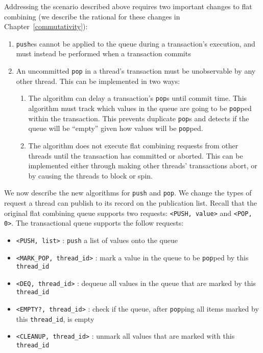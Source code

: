 Addressing the scenario described above requires two important changes to flat combining (we describe the rational for these changes in Chapter~\ref{commutativity}): 
\begin{enumerate}
\item \texttt{push}es cannot be applied to the queue during a transaction's execution, and must instead be performed when a transaction commits
\item An uncommitted \texttt{pop} in a thread's transaction must be unobservable by any other thread. This can be implemented in two ways:  
    \begin{enumerate}
        \item The algorithm can delay a transaction's \texttt{pop}s until commit time. This algorithm must track which values in the queue are going to be \texttt{pop}ped within the transaction. This prevents duplicate \texttt{pop}s and detects if the queue will be ``empty'' given how values will be \texttt{pop}ped.
        \item The algorithm does not execute flat combining requests from other threads until the transaction has committed or aborted. This can be implemented either through making other threads' transactions abort, or by causing the threads to block or spin.
    \end{enumerate}
\end{enumerate}

We now describe the new algorithms for \texttt{push} and \texttt{pop}.  We change the types of request a thread can publish to its record on the publication list. Recall that the original flat combining queue supports two requests: \texttt{<PUSH, value>} and \texttt{<POP, 0>}. The transactional queue supports the follow requests:
\begin{itemize}
    \item \texttt{<PUSH, list>} : \texttt{push} a list of values onto the queue
    \item \texttt{<MARK\_POP, thread\_id>} : mark a value in the queue to be \texttt{pop}ped by this \texttt{thread\_id}
    \item \texttt{<DEQ, thread\_id>} : dequeue all values in the queue that are marked by this \texttt{thread\_id}
    \item \texttt{<EMPTY?, thread\_id>} : check if the queue, after \texttt{pop}ping all items marked by this \texttt{thread\_id}, is empty
    \item \texttt{<CLEANUP, thread\_id>} : unmark all values that are marked with this \texttt{thread\_id}
\end{itemize}

